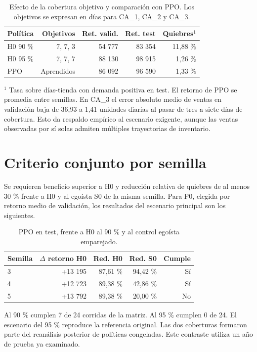 \documentclass[conference]{IEEEtran}
\begin{document}
\begin{table}[!ht]\centering\footnotesize
\caption{Efecto de la cobertura objetivo y comparación con PPO. Los objetivos se expresan en días para CA\_1, CA\_2 y CA\_3.}
\begin{tabular}{lrrrr}\toprule
Política & Objetivos & Ret. valid. & Ret. test & Quiebres$^{1}$\\\midrule
H0 90 \% & 7, 7, 3 & 54 777 & 83 354 & 11,88 \%\\
H0 95 \% & 7, 7, 7 & 88 130 & 98 915 & 1,26 \%\\
PPO & Aprendidos & 86 092 & 96 590 & 1,33 \%\\
\bottomrule\end{tabular}
\end{table}
$^{1}$ Tasa sobre días-tienda con demanda positiva en test. El retorno de PPO se promedia entre semillas. En CA\_3 el error absoluto medio de ventas en validación baja de 36,93 a 1,41 unidades diarias al pasar de tres a siete días de cobertura. Esto da respaldo empírico al escenario exigente, aunque las ventas observadas por sí solas admiten múltiples trayectorias de inventario.

\section*{Criterio conjunto por semilla}
Se requieren beneficio superior a H0 y reducción relativa de quiebres de al menos 30 \% frente a H0 y al egoísta S0 de la misma semilla. Para P0, elegida por retorno medio de validación, los resultados del escenario principal son los siguientes.

\begin{table}[!ht]\centering\footnotesize
\caption{PPO en test, frente a H0 al 90 \% y al control egoísta emparejado.}
\begin{tabular}{lrrrr}\toprule
Semilla & $\Delta$ retorno H0 & Red. H0 & Red. S0 & Cumple\\\midrule
3 & +13 195 & 87,61 \% & 94,42 \% & Sí\\
4 & +12 723 & 89,38 \% & 42,86 \% & Sí\\
5 & +13 792 & 89,38 \% & 20,00 \% & No\\
\bottomrule\end{tabular}
\end{table}
Al 90 \% cumplen 7 de 24 corridas de la matriz. Al 95 \% cumplen 0 de 24. El escenario del 95 \% reproduce la referencia original. Las dos coberturas formaron parte del reanálisis posterior de políticas congeladas. Este contraste utiliza un año de prueba ya examinado.
\end{document}
